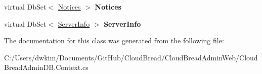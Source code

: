 \begin{DoxyCompactItemize}
\item 
virtual Db\+Set$<$ \hyperlink{a00168}{Notices} $>$ {\bfseries Notices}\hypertarget{a00065_acba614f544c7cac3062e5cf23e3f7ba1}{}\label{a00065_acba614f544c7cac3062e5cf23e3f7ba1}

\item 
virtual Db\+Set$<$ \hyperlink{a00178}{Server\+Info} $>$ {\bfseries Server\+Info}\hypertarget{a00065_a94422dffbcb562c866a3976651658e5f}{}\label{a00065_a94422dffbcb562c866a3976651658e5f}

\end{DoxyCompactItemize}


The documentation for this class was generated from the following file\+:\begin{DoxyCompactItemize}
\item 
C\+:/\+Users/dwkim/\+Documents/\+Git\+Hub/\+Cloud\+Bread/\+Cloud\+Bread\+Admin\+Web/Cloud\+Bread\+Admin\+D\+B.\+Context.\+cs\end{DoxyCompactItemize}
